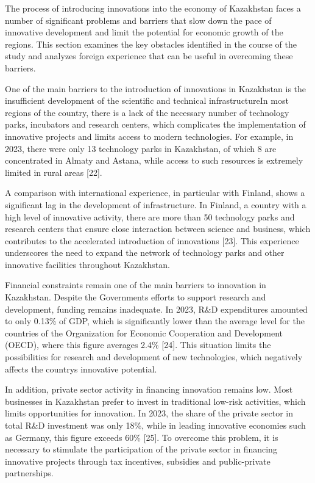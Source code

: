 The process of introducing innovations into the economy of Kazakhstan
faces a number of significant problems and barriers that slow down the
pace of innovative development and limit the potential for economic
growth of the regions. This section examines the key obstacles
identified in the course of the study and analyzes foreign experience
that can be useful in overcoming these barriers.

One of the main barriers to the introduction of innovations in
Kazakhstan is the insufficient development of the scientific and
technical infrastructureIn most regions of the country, there is a lack
of the necessary number of technology parks, incubators and research
centers, which complicates the implementation of innovative projects and
limits access to modern technologies. For example, in 2023, there were
only 13 technology parks in Kazakhstan, of which 8 are concentrated in
Almaty and Astana, while access to such resources is extremely limited
in rural areas {[}22{]}.

A comparison with international experience, in particular with Finland,
shows a significant lag in the development of infrastructure. In
Finland, a country with a high level of innovative activity, there are
more than 50 technology parks and research centers that ensure close
interaction between science and business, which contributes to the
accelerated introduction of innovations {[}23{]}. This experience
underscores the need to expand the network of technology parks and other
innovative facilities throughout Kazakhstan.

Financial constraints remain one of the main barriers to innovation in
Kazakhstan. Despite the Government\textquotesingle s efforts to support
research and development, funding remains inadequate. In 2023, R\&D
expenditures amounted to only 0.13\% of GDP, which is significantly
lower than the average level for the countries of the Organization for
Economic Cooperation and Development (OECD), where this figure averages
2.4\% {[}24{]}. This situation limits the possibilities for research and
development of new technologies, which negatively affects the
country\textquotesingle s innovative potential.

In addition, private sector activity in financing innovation remains
low. Most businesses in Kazakhstan prefer to invest in traditional
low-risk activities, which limits opportunities for innovation. In 2023,
the share of the private sector in total R\&D investment was only 18\%,
while in leading innovative economies such as Germany, this figure
exceeds 60\% {[}25{]}. To overcome this problem, it is necessary to
stimulate the participation of the private sector in financing
innovative projects through tax incentives, subsidies and public-private
partnerships.

